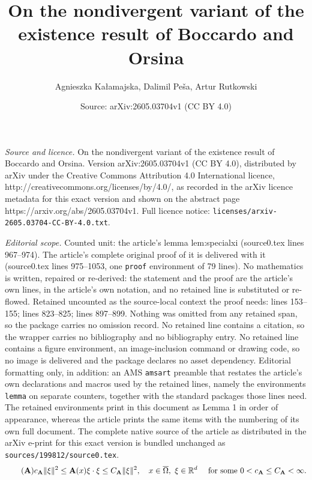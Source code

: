 \documentclass[10pt,a4paper]{amsart}
\title{On the nondivergent variant of the existence result of Boccardo and Orsina}
\author{Agnieszka Ka{\l}amajska, Dalimil Pe\v{s}a, Artur Rutkowski}
\date{Source: arXiv:2605.03704v1 (CC BY 4.0)}
\newcommand{\A}{\mathbf{A}}
\newcommand{\R}{\mathbb{R}}
\begin{document}
\maketitle

\noindent\emph{Source and licence.} On the nondivergent variant of the existence result of Boccardo and Orsina. Version arXiv:2605.03704v1 (CC BY 4.0), distributed by arXiv under the Creative Commons Attribution 4.0 International licence, http://creativecommons.org/licenses/by/4.0/, as recorded in the arXiv licence metadata for this exact version and shown on the abstract page https://arxiv.org/abs/2605.03704v1. Full licence notice: \texttt{licenses/arxiv-2605.03704-CC-BY-4.0.txt}.\par\smallskip

\noindent\textit{Editorial scope.} Counted unit: the article's lemma lem:specialxi (source0.tex lines 967--974). The article's complete original proof of it is delivered with it (source0.tex lines 975--1053, one \texttt{proof} environment of 79 lines). No mathematics is written, repaired or re-derived: the statement and the proof are the article's own lines, in the article's own notation, and no retained line is substituted or re-flowed.  Retained uncounted as the source-local context the proof needs: lines 153--155; lines 823--825; lines 897--899.  Nothing was omitted from any retained span, so the package carries no omission record.  No retained line contains a citation, so the wrapper carries no bibliography and no bibliography entry.  No retained line contains a figure environment, an image-inclusion command or drawing code, so no image is delivered and the package declares no asset dependency.  Editorial formatting only, in addition: an AMS \texttt{amsart} preamble that restates the article's own declarations and macros used by the retained lines, namely the environments \texttt{lemma} on separate counters, together with the standard packages those lines need.  The retained environments print in this document as Lemma 1 in order of appearance, whereas the article prints the same items with the numbering of its own full document.  The complete native source of the article as distributed in the arXiv e-print for this exact version is bundled unchanged as \texttt{sources/199812/source0.tex}.
\begin{align} \tag{$\A$} \label{ellipticity}
 c_{\A}\|\xi\|^2 \le \A(x)\xi \cdot \xi \le C_{\A} \|\xi\|^2,\quad x\in \overline{\Omega},\ \xi\in \R^d \quad \text{ for some } 0< c_{\A} \leq C_{\A} <\infty.
\end{align}
\end{document}
